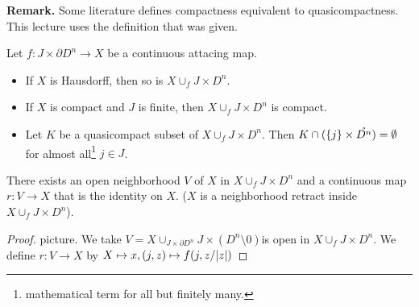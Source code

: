 \documentclass{TemplateLecture}
\begin{document}
\textbf{Remark.} Some literature defines compactness equivalent to quasicompactness. This lecture uses the definition that was given.

\begin{thm}
    Let \(f\colon J \times \partial D^n \to X\) be a continuous attacing map.
    \begin{itemize}
        \item If \(X\) is Hausdorff, then so is \(X \cup_f J\times D^n\).
        \item If \(X\) is compact and \(J\) is finite, then \(X \cup_f J\times D^n\) is compact.
        \item Let \(K\) be a quasicompact subset of \(X\cup_f J\times D^n.\) Then \(K\cap (\{j\} \times \mathring{D^n}) = \emptyset\) for almost all\footnote{mathematical term for all but finitely many.} \(j \in J\).
    \end{itemize}
\end{thm}

\begin{lem}
    There exists an open neighborhood \(V\) of \(X\) in \(X\cup_f J\times D^n\) and a continuous map \(r\colon V\to X\) that is the identity on \(X\). (\(X\) is a neighborhood retract inside \(X \cup_f J\times D^n\)).
\end{lem}

\begin{proof}
    picture.
    We take
    \(V = X\cup_{J\times \partial D^n} J\times (D^n\setminus {0})\)is open in \(X \cup_f J\times D^n\). We define \(r \colon V\to X\) by \(X\mapsto x, (j,z) \mapsto f(j, z/\lvert z\rvert)\)
\end{proof}
\end{document}
